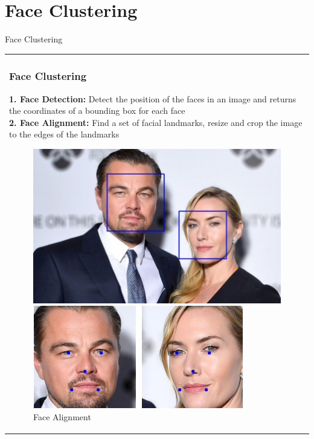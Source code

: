 \documentclass[11pt]{beamer}
\begin{document}
\section{Face Clustering}
\begin{frame}{Face Clustering}
\begin{tabular}{l}
\parbox{1\linewidth}{
\frametitle{Face Clustering}
\bigskip
\textbf{1. Face Detection:} Detect the position of the faces in an image and returns the coordinates of a bounding box for each face\\

\textbf{2. Face Alignment:} Find a set of facial landmarks, resize and crop the image to the edges of the landmarks
\begin{figure}[!tbp]
  \centering
  \begin{minipage}[b]{0.49\textwidth}
    \includegraphics[width=\textwidth]{figures/face_detection.png}
    \caption{Face Detection \cite{trigueros}}
    \label{fig:detect}
  \end{minipage}
    \begin{minipage}[b]{0.49\textwidth}
    \includegraphics[width=\textwidth]{figures/landmark.png}
    \caption{Face Alignment \cite{trigueros}}
    \label{fig:landmark}
  \end{minipage}
\end{figure}
}
\end{tabular}  
\end{frame}
\end{document}
